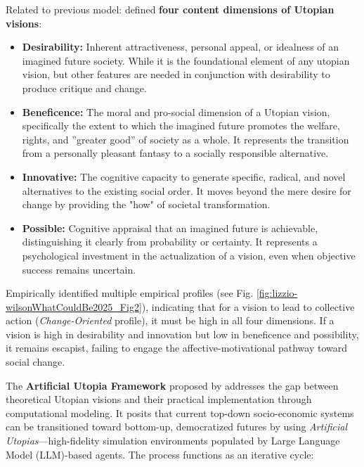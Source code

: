 \documentclass[jou,floatsintext]{apa7}
\begin{document}
\vspace{0.1cm}
    \hrulefill
\vspace{0.1cm}

Related to previous model: \cite{lizzio-wilsonWhatCouldBe2025} defined \textbf{four content dimensions of Utopian visions}:

\begin{itemize}
    \item \textbf{Desirability:} Inherent attractiveness, personal appeal, or idealness of an imagined future society. While it is the foundational element of any utopian vision, but other features are needed in conjunction with desirability to produce critique and change.
    \item \textbf{Beneficence:} The moral and pro-social dimension of a Utopian vision, specifically the extent to which the imagined future promotes the welfare, rights, and ''greater good'' of society as a whole. It represents the transition from a personally pleasant fantasy to a socially responsible alternative.
    \item \textbf{Innovative:} The cognitive capacity to generate specific, radical, and novel alternatives to the existing social order. It moves beyond the mere desire for change by providing the "how" of societal transformation.
    \item \textbf{Possible:} Cognitive appraisal that an imagined future is achievable, distinguishing it clearly from probability or certainty. It represents a psychological investment in the actualization of a vision, even when objective success remains uncertain.
\end{itemize}

Empirically \cite{lizzio-wilsonWhatCouldBe2025} identified multiple empirical profiles (see Fig. \ref{fig:lizzio-wilsonWhatCouldBe2025_Fig2}), indicating that for a vision to lead to collective action (\textit{Change-Oriented} profile), it must be high in all four dimensions. If a vision is high in desirability and innovation but low in beneficence and possibility, it remains escapist, failing to engage the affective-motivational pathway toward social change. 

\vspace{0.1cm}
    \hrulefill
\vspace{0.1cm}

The \textbf{Artificial Utopia Framework} proposed by \cite{oswaldArtificialUtopiaSimulation2025} addresses the gap between theoretical Utopian visions and their practical implementation through computational modeling. It posits that current top-down socio-economic systems can be transitioned toward bottom-up, democratized futures by using \textit{Artificial Utopias}---high-fidelity simulation environments populated by Large Language Model (LLM)-based agents. The process functions as an iterative cycle:
\end{document}
